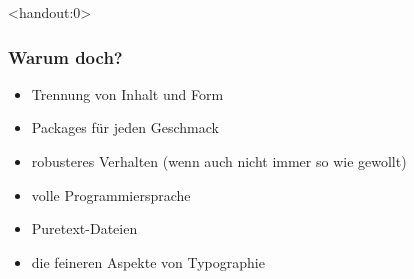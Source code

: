 \documentclass{beamer}                %
\begin{document}
\begin{frame}<handout:0>
    \frametitle{Warum doch?}
    \begin{itemize}
        \item
            Trennung von Inhalt und Form 
        \item
            Packages f\"ur jeden Geschmack
        \item
            robusteres Verhalten (wenn auch nicht immer so wie gewollt)
        \item
            volle Programmiersprache
        \item
            Puretext-Dateien
        \item
            die feineren Aspekte von Typographie
    \end{itemize}
\end{frame}

\end{document}

